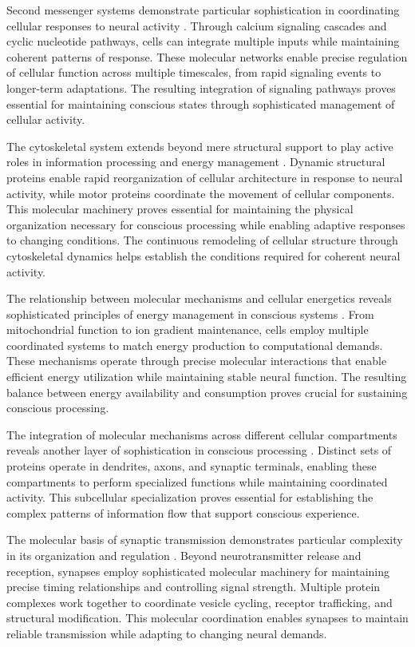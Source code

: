 \begin{refsection}
Second messenger systems demonstrate particular sophistication in coordinating cellular responses to neural activity \cite{Bashir2019}. Through calcium signaling cascades and cyclic nucleotide pathways, cells can integrate multiple inputs while maintaining coherent patterns of response. These molecular networks enable precise regulation of cellular function across multiple timescales, from rapid signaling events to longer-term adaptations. The resulting integration of signaling pathways proves essential for maintaining conscious states through sophisticated management of cellular activity.

The cytoskeletal system extends beyond mere structural support to play active roles in information processing and energy management \cite{Devor2016}. Dynamic structural proteins enable rapid reorganization of cellular architecture in response to neural activity, while motor proteins coordinate the movement of cellular components. This molecular machinery proves essential for maintaining the physical organization necessary for conscious processing while enabling adaptive responses to changing conditions. The continuous remodeling of cellular structure through cytoskeletal dynamics helps establish the conditions required for coherent neural activity.

The relationship between molecular mechanisms and cellular energetics reveals sophisticated principles of energy management in conscious systems \cite{Sengupta2014}. From mitochondrial function to ion gradient maintenance, cells employ multiple coordinated systems to match energy production to computational demands. These mechanisms operate through precise molecular interactions that enable efficient energy utilization while maintaining stable neural function. The resulting balance between energy availability and consumption proves crucial for sustaining conscious processing.

The integration of molecular mechanisms across different cellular compartments reveals another layer of sophistication in conscious processing \cite{Jonas2017}. Distinct sets of proteins operate in dendrites, axons, and synaptic terminals, enabling these compartments to perform specialized functions while maintaining coordinated activity. This subcellular specialization proves essential for establishing the complex patterns of information flow that support conscious experience.

The molecular basis of synaptic transmission demonstrates particular complexity in its organization and regulation \cite{Sudhof2018}. Beyond neurotransmitter release and reception, synapses employ sophisticated molecular machinery for maintaining precise timing relationships and controlling signal strength. Multiple protein complexes work together to coordinate vesicle cycling, receptor trafficking, and structural modification. This molecular coordination enables synapses to maintain reliable transmission while adapting to changing neural demands.


\end{refsection}

